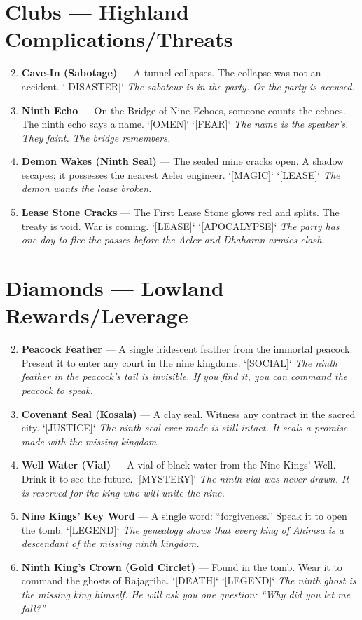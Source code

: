 \section*{Clubs --- Highland Complications/Threats}
\label{sec:dhahara-highland-complications}
\begin{enumerate}
\setcounter{enumi}{1}
\item \textbf{Cave-In (Sabotage)} --- A tunnel collapses. The collapse was not an accident. `[DISASTER]`
  \hfill \textit{The saboteur is in the party. Or the party is accused.}
\item \textbf{Ninth Echo} --- On the Bridge of Nine Echoes, someone counts the echoes. The ninth echo says a name. `[OMEN]` `[FEAR]`
  \hfill \textit{The name is the speaker's. They faint. The bridge remembers.}
\item \textbf{Demon Wakes (Ninth Seal)} --- The sealed mine cracks open. A shadow escapes; it possesses the nearest Aeler engineer. `[MAGIC]` `[LEASE]`
  \hfill \textit{The demon wants the lease broken.}
\item \textbf{Lease Stone Cracks} --- The First Lease Stone glows red and splits. The treaty is void. War is coming. `[LEASE]` `[APOCALYPSE]`
  \hfill \textit{The party has one day to flee the passes before the Aeler and Dhaharan armies clash.}
\end{enumerate}

\section*{Diamonds --- Lowland Rewards/Leverage}
\label{sec:dhahara-lowland-rewards}
\begin{enumerate}
\setcounter{enumi}{1}
\item \textbf{Peacock Feather} --- A single iridescent feather from the immortal peacock. Present it to enter any court in the nine kingdoms. `[SOCIAL]`
  \hfill \textit{The ninth feather in the peacock's tail is invisible. If you find it, you can command the peacock to speak.}
\item \textbf{Covenant Seal (Kosala)} --- A clay seal. Witness any contract in the sacred city. `[JUSTICE]`
  \hfill \textit{The ninth seal ever made is still intact. It seals a promise made with the missing kingdom.}
\item \textbf{Well Water (Vial)} --- A vial of black water from the Nine Kings' Well. Drink it to see the future. `[MYSTERY]`
  \hfill \textit{The ninth vial was never drawn. It is reserved for the king who will unite the nine.}
\item \textbf{Nine Kings' Key Word} --- A single word: ``forgiveness.'' Speak it to open the tomb. `[LEGEND]`
  \hfill \textit{The genealogy shows that every king of Ahimsa is a descendant of the missing ninth kingdom.}
\item \textbf{Ninth King's Crown (Gold Circlet)} --- Found in the tomb. Wear it to command the ghosts of Rajagriha. `[DEATH]` `[LEGEND]`
  \hfill \textit{The ninth ghost is the missing king himself. He will ask you one question: ``Why did you let me fall?''}
\end{enumerate}

